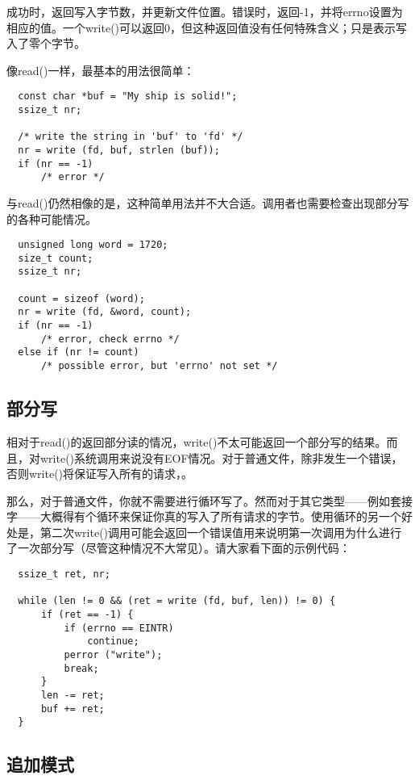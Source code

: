 成功时，返回写入字节数，并更新文件位置。错误时，返回-1，并将errno设置为相应的值。一个write()可以返回0，但这种返回值没有任何特殊含义；只是表示写入了零个字节。

像read()一样，最基本的用法很简单： 

\begin{lstlisting}
  const char *buf = "My ship is solid!";
  ssize_t nr;
 
  /* write the string in 'buf' to 'fd' */
  nr = write (fd, buf, strlen (buf));
  if (nr == -1)
      /* error */
\end{lstlisting}

与read()仍然相像的是，这种简单用法并不大合适。调用者也需要检查出现部分写的各种可能情况。

\begin{lstlisting}
  unsigned long word = 1720;
  size_t count;
  ssize_t nr;

  count = sizeof (word);
  nr = write (fd, &word, count);
  if (nr == -1)
      /* error, check errno */
  else if (nr != count)
      /* possible error, but 'errno' not set */
\end{lstlisting}

\subsection{部分写}

相对于read()的返回部分读的情况，write()不太可能返回一个部分写的结果。而且，对write()系统调用来说没有EOF情况。对于普通文件，除非发生一个错误，否则write()将保证写入所有的请求，。

那么，对于普通文件，你就不需要进行循环写了。然而对于其它类型——例如套接字——大概得有个循环来保证你真的写入了所有请求的字节。使用循环的另一个好处是，第二次write()调用可能会返回一个错误值用来说明第一次调用为什么进行了一次部分写（尽管这种情况不大常见）。请大家看下面的示例代码：

\begin{lstlisting}
  ssize_t ret, nr;

  while (len != 0 && (ret = write (fd, buf, len)) != 0) {
      if (ret == -1) {
          if (errno == EINTR)
              continue;
          perror ("write");
          break;
      }
      len -= ret;
      buf += ret;
  }
\end{lstlisting}

\subsection{追加模式}

